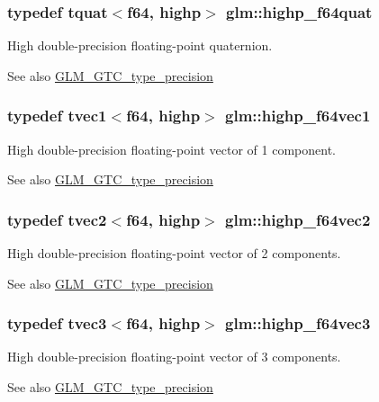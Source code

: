 \subsubsection[{highp\+\_\+f64quat}]{\setlength{\rightskip}{0pt plus 5cm}typedef {\bf tquat}$<${\bf f64}, highp$>$ {\bf glm\+::highp\+\_\+f64quat}}\label{namespaceglm_a50e023f42b7d0e2f40eff32ace71ae1a}
High double-\/precision floating-\/point quaternion. \begin{DoxySeeAlso}{See also}
\hyperlink{group__gtc__type__precision}{G\+L\+M\+\_\+\+G\+T\+C\+\_\+type\+\_\+precision} 
\end{DoxySeeAlso}
\hypertarget{namespaceglm_ac123e65849952ae8d2bf29ac8b7ff651}{}
\subsubsection[{highp\+\_\+f64vec1}]{\setlength{\rightskip}{0pt plus 5cm}typedef tvec1$<${\bf f64}, highp$>$ {\bf glm\+::highp\+\_\+f64vec1}}\label{namespaceglm_ac123e65849952ae8d2bf29ac8b7ff651}
High double-\/precision floating-\/point vector of 1 component. \begin{DoxySeeAlso}{See also}
\hyperlink{group__gtc__type__precision}{G\+L\+M\+\_\+\+G\+T\+C\+\_\+type\+\_\+precision} 
\end{DoxySeeAlso}
\hypertarget{namespaceglm_a8505b425f783dae009868544b702bbd9}{}
\subsubsection[{highp\+\_\+f64vec2}]{\setlength{\rightskip}{0pt plus 5cm}typedef tvec2$<${\bf f64}, highp$>$ {\bf glm\+::highp\+\_\+f64vec2}}\label{namespaceglm_a8505b425f783dae009868544b702bbd9}
High double-\/precision floating-\/point vector of 2 components. \begin{DoxySeeAlso}{See also}
\hyperlink{group__gtc__type__precision}{G\+L\+M\+\_\+\+G\+T\+C\+\_\+type\+\_\+precision} 
\end{DoxySeeAlso}
\hypertarget{namespaceglm_a106c06c5b5dbb5d42f5756bd5ddf5cc5}{}
\subsubsection[{highp\+\_\+f64vec3}]{\setlength{\rightskip}{0pt plus 5cm}typedef tvec3$<${\bf f64}, highp$>$ {\bf glm\+::highp\+\_\+f64vec3}}\label{namespaceglm_a106c06c5b5dbb5d42f5756bd5ddf5cc5}
High double-\/precision floating-\/point vector of 3 components. \begin{DoxySeeAlso}{See also}
\hyperlink{group__gtc__type__precision}{G\+L\+M\+\_\+\+G\+T\+C\+\_\+type\+\_\+precision} 
\end{DoxySeeAlso}
\hypertarget{namespaceglm_a9cd05269ce35a146935adeba5e63d189}{}
